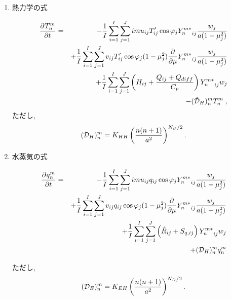 \begin{enumerate}
\item 熱力学の式

\begin{eqnarray}
  \DP{T_n^m}{t}
  & = & - \frac{1}{I} \sum_{i=1}^{I} \sum_{j=1}^{J}  
          im u_{ij} T'_{ij} \cos\varphi_j
          {Y_n^{m *}}_{ij}
         \frac{w_j}{a(1-\mu_j^{2})} 
         \nonumber \\
  &  & + \frac{1}{I} \sum_{i=1}^{I} \sum_{j=1}^{J}  
          v_{ij} T'_{ij} \cos\varphi_j
          (1-\mu_j^2) 
          \frac{\partial }{\partial \mu} {Y_n^{m *}}_{ij}
          \frac{w_j}{a(1-\mu_j^{2})} 
         \nonumber \\
  &  & + \frac{1}{I} \sum_{i=1}^{I} \sum_{j=1}^{J}  
          \left( H_{ij} + \frac{Q_{ij}+Q_{diff}}{C_{p}} \right)
          {Y_n^{m *}}_{ij} w_j
         \nonumber \\ 
  &  & - (\tilde{\cal D}_H)_n^m T_n^m \; ,
\end{eqnarray}
%
ただし,
%
\begin{equation}
({\cal D}_H)_n^m 
   =  K_{HH} \left( \frac{n(n+1)}{a^{2}} \right)^{N_D/2} .
\end{equation}



\item 水蒸気の式

\begin{eqnarray}
  \DP{q_n^m}{t}
  & = & - \frac{1}{I} \sum_{i=1}^{I} \sum_{j=1}^{J}  
          im u_{ij} q_{ij} \cos\varphi_j
          {Y_n^{m *}}_{ij} \frac{w_j}{a(1-\mu_j^{2})} 
         \nonumber \\
  &  & + \frac{1}{I} \sum_{i=1}^{I} \sum_{j=1}^{J}  
          v_{ij} q_{ij} \cos\varphi_j
          (1-\mu_j^2) 
          \frac{\partial }{\partial \mu} {Y_n^{m *}}_{ij}
          \frac{w_j}{a(1-\mu_j^{2})} 
         \nonumber \\
  &  & + \frac{1}{I} \sum_{i=1}^{I} \sum_{j=1}^{J}  
          \left( \hat{R}_{ij} + S_{q,ij} \right)
          {Y_n^{m *}}_{ij} w_j
         \nonumber \\ 
  &  & + ({\cal D}_H)_n^m q_n^m
\end{eqnarray}

ただし,
%
\begin{equation}
({\cal D}_E)_n^m 
   =  K_{EH} \left( \frac{n(n+1)}{a^{2}} \right)^{N_D/2} .
\end{equation}



\end{enumerate}

